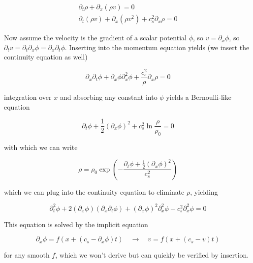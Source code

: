 \begin{equation}
    \begin{gathered}
        \partial_t \rho + \partial_x (\rho v) = 0  \\
        \partial_t (\rho v) + \partial_x (\rho v^2) + c_s^2 \partial_x \rho = 0
    \end{gathered} 
\end{equation}

Now assume the velocity is the gradient of a scalar potential $\phi$, so $v = \partial_x \phi$, so
$\partial_t v = \partial_t \partial_x \phi = \partial_x \partial_t \phi$. Inserting into the momentum
equation yields (we insert the continuity equation as well)

\begin{equation}
    \partial_x \partial_t \phi + \partial_x \phi \partial_x^2 \phi + \frac{c_s^2}{\rho} \partial_x \rho = 0
\end{equation}

integration over $x$ and absorbing any constant into $\phi$ yields a Bernoulli-like equation

\begin{equation}
    \partial_t \phi + \frac{1}{2} \left(\partial_x \phi\right)^2 + c_s^2 \ln \frac{\rho}{\rho_0} = 0
\end{equation}

with which we can write

\begin{equation}
    \rho = \rho_0 \exp \left( - \frac{\partial_t \phi + \frac{1}{2} (\partial_x \phi) ^2}{c_s^2} \right)
\end{equation}

which we can plug into the continuity equation to eliminate $\rho$, yielding

\begin{equation}
    \partial_t^2 \phi+2\left(\partial_x \phi\right)\left(\partial_x \partial_t \phi\right)+\left(\partial_x \phi\right)^2 \partial_x^2 \phi-c_s^2 \partial_x^2 \phi=0
\end{equation}

This equation is solved by the implicit equation

\begin{equation}
    \partial_x \phi=f\left(x+\left(c_s-\partial_x \phi\right) t\right) \quad \rightarrow \quad v = f\left(x+\left(c_s-v\right) t\right)
\end{equation}

for any smooth $f$, which we won't derive but can quickly be verified by insertion.

